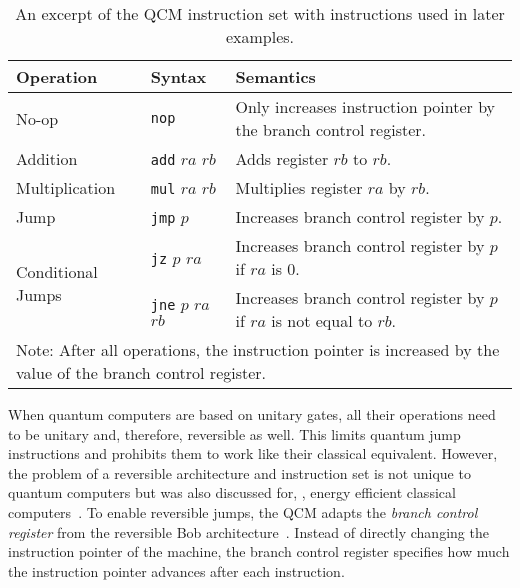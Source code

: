 \begin{table}[htp]
    \centering
    \begin{tabular}{llp{}}
        \multicolumn{1}{l|}{Operation}                          & \multicolumn{1}{l|}{Syntax}                                      & Semantics                                                              \\ \hline
        
        \multicolumn{1}{l|}{No-op}                              & \multicolumn{1}{l|}{\texttt{nop}}               & Only increases instruction pointer by the branch control register.     \\ \hline
        
        \multicolumn{1}{l|}{Addition}                           & \multicolumn{1}{l|}{\texttt{add} $ra$ $rb$}     & Adds register $rb$ to $rb$.                                            \\
        \multicolumn{1}{l|}{Multiplication}                     & \multicolumn{1}{l|}{\texttt{mul} $ra$ $rb$}     & Multiplies register $ra$ by $rb$.                                      \\ \hline
        
        \multicolumn{1}{l|}{Jump}                               & \multicolumn{1}{l|}{\texttt{jmp} $p$}           & Increases branch control register by $p$.                              \\
        \multicolumn{1}{l|}{\multirow{2}{*}{Conditional Jumps}} & \multicolumn{1}{l|}{\texttt{jz} $p$ $ra$}       & Increases branch control register by $p$ if $ra$ is $0$.               \\
        \multicolumn{1}{l|}{}                                   & \multicolumn{1}{l|}{\texttt{jne} $p$ $ra$ $rb$} & Increases branch control register by $p$ if $ra$ is not equal to $rb$. \\ \hline
        
        \multicolumn{3}{p{.9\textwidth}}{\small Note: After all operations, the instruction pointer is increased by the value of the branch control register.}                                                                  
    \end{tabular}
    \caption{An excerpt of the QCM instruction set with instructions used in later examples.}
    \label{tab:qcm_instructionset}
\end{table}

When quantum computers are based on unitary gates, all their operations need to be unitary and, therefore, reversible as well. This limits quantum jump instructions and prohibits them to work like their classical equivalent. However, the problem of a reversible architecture and instruction set is not unique to quantum computers but was also discussed for, \eg, energy efficient classical computers~\cite{AGY07, TAG12}. 
To enable reversible jumps, the QCM adapts the \emph{branch control register} from the reversible Bob architecture~\cite{TAG12}. Instead of directly changing the instruction pointer of the machine, the branch control register specifies how much the instruction pointer advances after each instruction.

